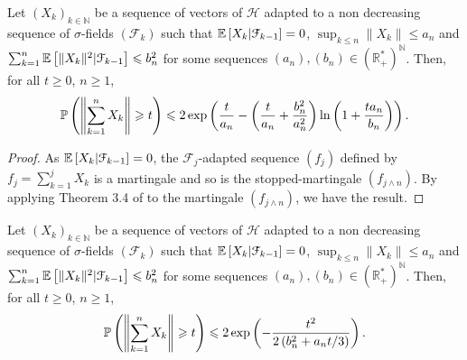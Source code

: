 \begin{proposition}
\label{Probabilisticprop}
Let $(X_k)_{k \in \mathbb{N}}$ be a sequence of vectors of $\mathcal{H}$ adapted to a non decreasing sequence of $\sigma$-fields $(\mathcal{F}_k)$ such that $\E \left[ X_k | \mathcal{F}_{k-1} \right] = 0$, $\sup_{k \leqslant n} \| X_k \| \leqslant a_n$ and $\sum_{k = 1}^n \E \left[ \|X_k\|^2 | \mathcal{F}_{k-1} \right] \leqslant b_n^2$ for some sequences $(a_n),(b_n) \in \left(\mathbb{R}_+^*\right)^{\mathbb{N}}$. Then, for all $t  \geqslant 0$, $n \geqslant 1$,
\begin{eqnarray}
\P \left( \left\| \sum_{k = 1}^n X_k  \right\| \geqslant t \right) \leqslant 2 \exp\left( \frac{t}{a_n} - \left(\frac{t}{a_n} + \frac{b_n^2}{a_n^2}\right)\ln \left( 1+ \frac{t a_n}{b_n} \right)\right).
\end{eqnarray}  
\end{proposition}
\begin{proof}
As $\E \left[ X_k | \mathcal{F}_{k-1} \right] = 0$, the $\mathcal{F}_j$-adapted sequence $(f_j)$ defined by $f_j = \sum_{k = 1}^j X_k$ is a martingale and so is the stopped-martingale $(f_{j\wedge n})$. By applying Theorem 3.4 of \citet{pinelis1994optimum} to the martingale $(f_{j\wedge n})$, we have the result.
\end{proof}

\begin{corollary}
\label{Probabilisticcor}
Let $(X_k)_{k \in \mathbb{N}}$ be a sequence of vectors of $\mathcal{H}$ adapted to a non decreasing sequence of $\sigma$-fields $(\mathcal{F}_k)$ such that $\E \left[ X_k | \mathcal{F}_{k-1} \right] = 0$, $\sup_{k \leqslant n} \| X_k \| \leqslant a_n$ and $\sum_{k = 1}^n \E \left[ \|X_k\|^2 | \mathcal{F}_{k-1} \right] \leqslant b_n^2$ for some sequences $(a_n),(b_n) \in \left(\mathbb{R}_+^*\right)^{\mathbb{N}}$. Then, for all $t \geqslant 0$, $n \geqslant 1$,
\begin{eqnarray}
\P \left( \left\| \sum_{k = 1}^n X_k  \right\| \geqslant t \right) \leqslant 2 \exp\left(-\frac{t^2}{2\left( b_n^2 + a_n t / 3 \right)}\right).
\end{eqnarray}  
\end{corollary}

